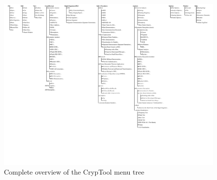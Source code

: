 \clearpage
\begin{figure}[hb]
\begin{center}
\vspace{-30pt}
\includegraphics[scale=0.75, angle=270, viewport=14 72 835 590]{figures/cryptool-menu-en}
\caption{Complete overview of the CrypTool menu tree} 
\label{menuoverview}
\end{center}
\end{figure}
\clearpage

